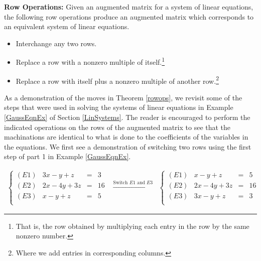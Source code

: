 \documentclass{ximera}
\begin{document}
\smallskip


\begin{theorem}  \label{rowops} \textbf{Row Operations:}  Given an augmented matrix for a system of linear equations, the following row operations produce an augmented matrix which corresponds to an equivalent system of linear equations.  

\begin{itemize}

\item  Interchange any two rows.

\item  Replace a row with a nonzero multiple of itself.\footnote{That is, the row obtained by multiplying each entry in the row by the same nonzero number.}

\item  Replace a row with itself plus a nonzero multiple of another row.\footnote{Where we add entries in  corresponding columns.}

\end{itemize}

\end{theorem}  


\smallskip 

As a demonstration of the moves in Theorem \ref{rowops}, we revisit some of the steps that were used in solving the systems of linear equations in Example \ref{GaussEqnEx} of Section \ref{LinSystems}.  The reader is encouraged to perform the indicated operations on the rows of the augmented matrix to see that the machinations are identical to what is done to the coefficients of the variables in the equations. We first see a demonstration of switching two rows using the first step of part 1 in Example \ref{GaussEqnEx}. 

\[\begin{array}{ccc}

\left\{  \begin{array}{lrcr}

(E1) & 3x-y+z & = & 3 \\
(E2) & 2x-4y+3z & = & 16 \\
(E3)  &  x-y+z & = & 5 \\ 

\end{array} \right.

&
\xrightarrow{\text{Switch $E1$ and $E3$}}

&

\left\{ \begin{array}{lrcr}

(E1) & x-y+z & = & 5 \\
(E2) & 2x-4y+3z & = & 16 \\
(E3) & 3x-y+z & = & 3 \\

\end{array} \right.

\end{array}\]
\end{document}
